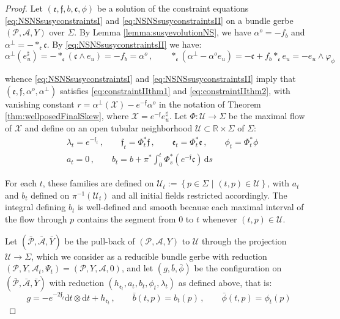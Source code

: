 \documentclass[10pt,reqno,a4paper]{amsart}
\theoremstyle{plain}
\theoremstyle{definition}
\theoremstyle{remark}
\theoremstyle{remark}
\def\dd{\mathrm{d}}
\def\cA{\mathcal{A}}
\def\cP{\mathcal{P}}
\def\cX{\mathcal{X}}
\def\frc{\mathfrak{c}}
\def\cU{\mathcal{U}}
\def\fre{\mathfrak{e}}
\renewcommand{\(}{ (}
\renewcommand{\)}{ )}
\newcommand{\frf}{\mathfrak{f}}
\begin{document}
\begin{proof}
Let  $(\fre,\frf,b,\frc,\phi)$ be a solution of the constraint equations \eqref{eq:NSNSsusyconstraintsI} and \eqref{eq:NSNSsusyconstraintsII} on a bundle gerbe $(\cP,\cA,Y)$ over $\Sigma$. By Lemma \ref{lemma:susyevolutionNS}, we have $\alpha^o = -f_b$ and $\alpha^{\perp} = -\ast_{\fre}\frc$. By \eqref{eq:NSNSsusyconstraintsII} we have:
\begin{equation*}
 \alpha^{\perp}(e^{\sharp}_u) = -\ast_{\fre}(\frc\wedge e_u) = -f_b = \alpha^o\, , \qquad \ast_{\fre}(\alpha^{\perp} - \alpha^o e_u) = -\frc + f_b \ast_{\fre} e_u = - e_u\wedge\varphi_{\phi}
\end{equation*}

\noindent
whence \eqref{eq:NSNSsusyconstraintsI} and \eqref{eq:NSNSsusyconstraintsII} imply that $(\fre,\frf,\alpha^o,\alpha^{\perp})$ satisfies \eqref{eq:constraintIIthm1} and \eqref{eq:constraintIIthm2}, with vanishing constant $r = \alpha^{\perp}(\cX) - e^{-\frf}\alpha^o$ in the notation of Theorem \ref{thm:wellposedFinalSkew}, where $\cX = e^{-\frf}e^{\sharp}_u$. Let $\Phi\colon \cU\to\Sigma$ be the maximal flow of $\cX$ and define on an open tubular neighborhood $\cU\subset \mathbb{R} \times \Sigma$ of $\Sigma$:
\begin{eqnarray}
& \lambda_t = e^{-\frf_t}\, , \qquad \frf_t = \Phi_t^{\ast}\frf\, , \qquad \fre_t = \Phi_t^{\ast}\fre\, , \qquad \phi_t = \Phi_t^{\ast}\phi \nonumber \\
& a_t = 0\, , \qquad b_t = b + \pi^{\ast}\int_0^t \Phi_s^{\ast}(e^{-\frf}\frc)\, \dd s \label{eq:NSNSexplicitdevelopment}
\end{eqnarray}

\noindent
For each $t$, these families are defined on $\cU_t := \left\{p\in\Sigma\,\,\vert\,\,(t,p)\in\cU\right\}$, with $a_t$ and $b_t$ defined on $\pi^{-1}(\cU_t)$ and all initial fields restricted accordingly. The integral defining $b_t$ is well-defined and smooth because each maximal interval of the flow through $p$ contains the segment from $0$ to $t$ whenever $(t,p)\in\cU$.

\noindent
Let $(\bar{\cP},\bar{\cA},\bar{Y})$ be the pull-back of $(\cP,\cA,Y)$ to $\cU$ through the projection $\cU\to\Sigma$, which we consider as a reducible bundle gerbe with reduction $(\cP,Y,\cA_t,\Psi_t) = (\cP,Y,\cA,0)$, and let $(g,\bar{b},\bar{\phi})$ be the configuration on $(\bar{\cP},\bar{\cA},\bar{Y})$ with reduction $(h_{\fre_t},a_t,b_t,\phi_t,\lambda_t)$ as defined above, that is:
\begin{equation*}
g = -e^{-2\frf_t}\dd t\otimes \dd t + h_{\fre_t}  \, , \qquad \bar{b}(t,p) = b_t(p)  \, , \qquad \bar{\phi}(t,p) = \phi_t(p)
\end{equation*}


\end{proof}
\end{document}
